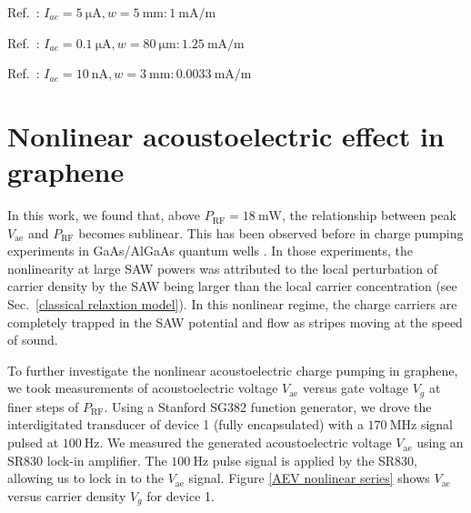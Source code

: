 \documentclass[double,12pt,1in,seploa]{beavtex}
\let\Oldsection\section
\renewcommand{\section}{\FloatBarrier\Oldsection}
\begin{document}
\noindent
Ref.\ \cite{okuda_acoustic_2016}: $I_{ae} = \SI{5}{\micro \ampere}, w = \SI{5}{\milli\meter}: \SI{1}{\milli \ampere/\meter}$

\noindent
Ref.\ \cite{tang_ultra-low_2017}: $I_{ae} = \SI{0.1}{\micro \ampere}, w = \SI{80}{\micro\meter}: \SI{1.25}{\milli \ampere/\meter}$

\noindent
Ref.\ \cite{bandhu_controlling_2016}: $I_{ae} = \SI{10}{\nano \ampere}, w = \SI{3}{\milli\meter}: \SI{0.0033}{\milli \ampere/\meter}$


\section{Nonlinear acoustoelectric effect in graphene} \label{nonlinear acoustoelectric effect}

In this work, we found that, above $P_{\mathrm{RF}} = \SI{18}{\milli\watt}$, the relationship between peak $V_{\mathrm{ae}}$ and $P_{\mathrm{RF}}$ becomes sublinear. This has been observed before in charge pumping experiments in GaAs/AlGaAs quantum wells \cite{rotter_charge_1999,rotter_nonlinear_1999}. In those experiments, the nonlinearity at large SAW powers was attributed to the local perturbation of carrier density by the SAW being larger than the local carrier concentration (see Sec.\ \ref{classical relaxtion model}). In this nonlinear regime, the charge carriers are completely trapped in the SAW potential and flow as stripes moving at the speed of sound.

To further investigate the nonlinear acoustoelectric charge pumping in graphene, we took measurements of acoustoelectric voltage $V_{\mathrm{ae}}$ versus gate voltage $V_g$ at finer steps of $P_{\mathrm{RF}}$. Using a Stanford SG382 function generator, we drove the interdigitated transducer of device 1 (fully encapsulated) with a $\SI{170}{\mega\hertz}$ signal pulsed at $\SI{100}{\hertz}$. We measured the generated acoustoelectric voltage $V_{\mathrm{ae}}$ using an SR830 lock-in amplifier. The $\SI{100}{\hertz}$ pulse signal is applied by the SR830, allowing us to lock in to the $V_{\mathrm{ae}}$ signal. Figure \ref{AEV nonlinear series} shows $V_{\mathrm{ae}}$ versus carrier density $V_g$ for device 1.
\end{document}

